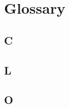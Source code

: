 


\chapter{Glossary}\label{glossary:cha}

\section*{C}
\begin{multicols}{2}

\end{multicols}

\section*{L}
\begin{multicols}{2}

\end{multicols}

\section*{O}
\begin{multicols}{2}

\end{multicols}


